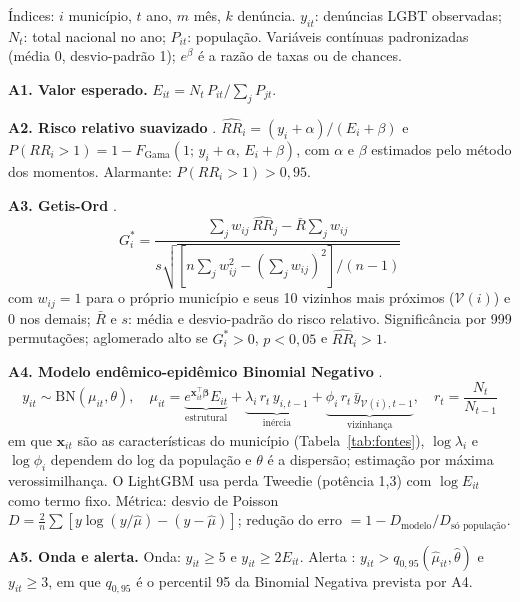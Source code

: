 \documentclass[12pt]{article}
\begin{document}
{\small
Índices: $i$ município, $t$ ano, $m$ mês, $k$ denúncia. $y_{it}$: denúncias LGBT observadas; $N_t$: total nacional no ano; $P_{it}$: população. Variáveis contínuas padronizadas (média 0, desvio-padrão 1); $e^{\beta}$ é a razão de taxas ou de chances.

\textbf{A1. Valor esperado.} $E_{it} = N_t\, P_{it} / \sum_j P_{jt}$.

\textbf{A2. Risco relativo suavizado} \cite{marshall:1991}. $\widehat{RR}_i = (y_i+\alpha)/(E_i+\beta)$ e $P(RR_i>1) = 1 - F_{\text{Gama}}(1;\, y_i+\alpha,\, E_i+\beta)$, com $\alpha$ e $\beta$ estimados pelo método dos momentos. Alarmante: $P(RR_i>1) > 0{,}95$.

\textbf{A3. Getis-Ord} \cite{getis_ord:1992}.
\begin{equation*}
G_i^{*} = \frac{\sum_{j} w_{ij}\, \widehat{RR}_j - \bar{R}\sum_j w_{ij}}{s\sqrt{\left[n\sum_j w_{ij}^2 - \left(\sum_j w_{ij}\right)^2\right]/(n-1)}}
\end{equation*}
com $w_{ij}=1$ para o próprio município e seus 10 vizinhos mais próximos ($\mathcal{V}(i)$) e 0 nos demais; $\bar{R}$ e $s$: média e desvio-padrão do risco relativo. Significância por 999 permutações; aglomerado alto se $G_i^{*}>0$, $p<0{,}05$ e $\widehat{RR}_i>1$.

\textbf{A4. Modelo endêmico-epidêmico Binomial Negativo} \cite{held_hohle_hofmann:2005}.
\begin{equation*}
y_{it} \sim \text{BN}(\mu_{it}, \theta), \quad
\mu_{it} = \underbrace{e^{\mathbf{x}_{it}^{\top}\boldsymbol{\beta}} E_{it}}_{\text{estrutural}}
+ \underbrace{\lambda_i\, r_t\, y_{i,t-1}}_{\text{inércia}}
+ \underbrace{\phi_i\, r_t\, \bar{y}_{\mathcal{V}(i),t-1}}_{\text{vizinhança}}, \quad r_t = \frac{N_t}{N_{t-1}}
\end{equation*}
em que $\mathbf{x}_{it}$ são as características do município (Tabela~\ref{tab:fontes}), $\log\lambda_i$ e $\log\phi_i$ dependem do log da população e $\theta$ é a dispersão; estimação por máxima verossimilhança. O LightGBM usa perda Tweedie (potência 1,3) com $\log E_{it}$ como termo fixo. Métrica: desvio de Poisson $D = \frac{2}{n}\sum \left[y \log(y/\hat{\mu}) - (y-\hat{\mu})\right]$; redução do erro $= 1 - D_{\text{modelo}}/D_{\text{só população}}$.

\textbf{A5. Onda e alerta.} Onda: $y_{it} \ge 5$ e $y_{it} \ge 2E_{it}$. Alerta \cite{farrington:1996}: $y_{it} > q_{0,95}(\hat{\mu}_{it}, \hat{\theta})$ e $y_{it}\ge 3$, em que $q_{0,95}$ é o percentil 95 da Binomial Negativa prevista por A4.

}
\end{document}
